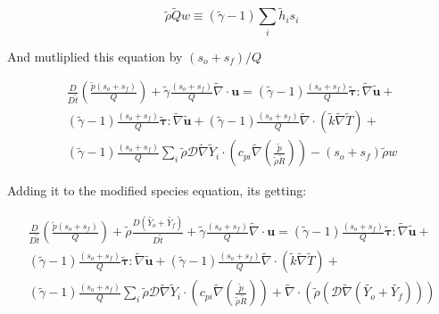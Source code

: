 \documentclass[preprint,12pt,authoryear]{elsarticle}
\begin{document}
{\begin{equation}
\tilde{\rho}\tilde{Q}w
\equiv
(\tilde{\gamma}-1)
\sum\limits_i
\tilde{h}_i
s_i	
\end{equation}

And mutliplied this equation by  $(s_o+s_f)/Q$

\begin{equation}
\begin{split}
	\frac{D }{D\tilde{t}}
	\left(
		\frac{\tilde{p}(s_o+s_f)}{Q}
	\right)
	+
	\tilde{\gamma}
	\frac{(s_o+s_f)}{Q}
	\tilde{\nabla}\cdot{\mathbf{u}}
        =
	(\tilde{\gamma}-1)
	\frac{(s_o+s_f)}{Q}
        \pmb{\tilde{\tau}}:\tilde{\nabla} \tilde{\mathbf{u}} 
        + 
	\\
	(\tilde{\gamma}-1)
	\frac{(s_o+s_f)}{Q}
        \pmb{\tilde{\tau}}:\tilde{\nabla} \tilde{\mathbf{u}} 
        + 
	(\tilde{\gamma}-1)
	\frac{(s_o+s_f)}{Q}
        \tilde{\nabla} \cdot (\tilde{k}\tilde{\nabla} \tilde{T})
        +
	\\
	(\tilde{\gamma}-1)
	\frac{(s_o+s_f)}{Q}
        \sum\limits_i 
        \tilde{\rho}
        \mathcal{D}
        \tilde{\nabla}
        \tilde{Y}_i     
        \cdot
        \left(
                c_{pi}
                \tilde{\nabla}
                \left(
                	\frac{\tilde{p}}{\tilde{\rho}\tilde{R}}
                \right)
        \right)
	- 
	(s_o+s_f)
	\tilde{\rho}w
\end{split}
\end{equation}

Adding it to the modified species equation, its getting:

\begin{equation}
\begin{split}
	\frac{D }{D\tilde{t}}
	\left(
		\frac{\tilde{p}(s_o+s_f)}{Q}
	\right)
	+
	\tilde{\rho} \frac{D  (\tilde{Y_o}+\tilde{Y_f})}{D \tilde{t}}
	+
	\tilde{\gamma}
	\frac{(s_o+s_f)}{Q}
	\tilde{\nabla}\cdot{\mathbf{u}}
        =
	(\tilde{\gamma}-1)
	\frac{(s_o+s_f)}{Q}
        \pmb{\tilde{\tau}}:\tilde{\nabla} \tilde{\mathbf{u}} 
        + 
	\\
	(\tilde{\gamma}-1)
	\frac{(s_o+s_f)}{Q}
        \pmb{\tilde{\tau}}:\tilde{\nabla} \tilde{\mathbf{u}} 
        + 
	(\tilde{\gamma}-1)
	\frac{(s_o+s_f)}{Q}
        \tilde{\nabla} \cdot (\tilde{k}\tilde{\nabla} \tilde{T})
        +
	\\
	(\tilde{\gamma}-1)
	\frac{(s_o+s_f)}{Q}
        \sum\limits_i 
        \tilde{\rho}
        \mathcal{D}
        \tilde{\nabla}
        \tilde{Y}_i     
        \cdot
        \left(
                c_{pi}
                \tilde{\nabla}
                \left(
                	\frac{\tilde{p}}{\tilde{\rho}\tilde{R}}
                \right)
        \right)
	+
	\tilde{\nabla}
	\cdot
	\left( 
		\tilde{\rho} 
		\left( 
			\mathcal{D}\tilde{\nabla} (\tilde{Y_o}+\tilde{Y_f})
		\right) 
	\right) 
\end{split}
\end{equation}

}
\end{document}
